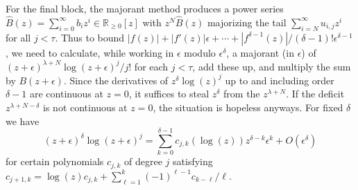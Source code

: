 \documentclass[12pt]{article}
\numberwithin{equation}{section}
\begin{document}
For the final block, the majorant method produces a power series $\hat{B}(z) = \sum_{i=0}^{\infty} b_i z^i \in \mathbb{R}_{\ge 0}[z]$ with $z^N \hat{B}(z)$ majorizing the tail $\sum_{i = N}^{\infty} u_{i,j} z^i$ for all $j<\tau$. Thus to bound $|f(z)| + |f'(z)| \epsilon + \cdots + |f^{\delta-1}(z)|/(\delta-1)! \epsilon^{\delta-1}$, we need to calculate, while working in $\epsilon$ modulo $\epsilon^{\delta}$, a majorant (in $\epsilon$) of $(z+\epsilon)^{\lambda+N} \log(z+\epsilon)^j/j!$ for each $j<\tau$, add these up, and multiply the sum by $B(z+\epsilon)$. Since the derivatives of $z^\delta \log(z)^{j}$ up to and including order $\delta-1$ are continuous at $z=0$, it suffices to steal $z^\delta$ from the $z^{\lambda+N}$. If the deficit $z^{\lambda+N-\delta}$ is not continuous at $z=0$, the situation is hopeless anyways.
For fixed $\delta$ we have
\begin{equation*}
(z+\epsilon)^\delta \log(z+\epsilon)^{j} = \sum_{k=0}^{\delta-1} c_{j,k}(\log(z)) z^{\delta-k} \epsilon^{k} + O(\epsilon^\delta)
\end{equation*}
for certain polynomials $c_{j,k}$ of degree $j$ satisfying $c_{j+1,k} = \log(z) c_{j,k} + \sum_{\ell=1}^{k} (-1)^{\ell-1}c_{k-\ell}/\ell$.
\end{document}
